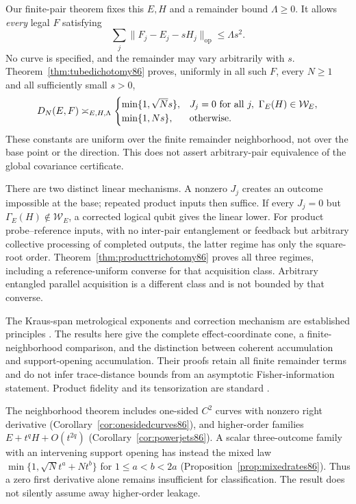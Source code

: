 Our finite-pair theorem fixes this $E,H$ and a remainder bound
$\Lambda\ge0$.  It allows \emph{every} legal $F$ satisfying
\[
 \sum_j\|F_j-E_j-sH_j\|_{\mathrm{op}}\le\Lambda s^2.
\]
No curve is specified, and the remainder may vary arbitrarily with
$s$.  Theorem~\ref{thm:tubedichotomy86} proves, uniformly in all such
$F$, every $N\ge1$ and all sufficiently small $s>0$,
\[
 D_N(E,F)\asymp_{E,H,\Lambda}
 \begin{cases}
 \min\{1,\sqrt N s\},&J_j=0\ \hbox{for all }j,
                         \ \Gamma_E(H)\in\mathcal W_E,\\
 \min\{1,Ns\},&\hbox{otherwise}.
 \end{cases}
\]
These constants are uniform over the finite remainder neighborhood,
not over the base point or the direction.  This does not assert
arbitrary-pair equivalence of the global covariance certificate.

There are two distinct linear mechanisms.  A nonzero $J_j$ creates an
outcome impossible at the base; repeated product inputs then suffice.
If every $J_j=0$ but $\Gamma_E(H)\notin\mathcal W_E$, a corrected
logical qubit gives the linear lower.  For product probe--reference
inputs, with no inter-pair entanglement or feedback but arbitrary
collective processing of completed outputs, the latter regime has
only the square-root order.  Theorem~\ref{thm:producttrichotomy86}
proves all three regimes, including a reference-uniform converse
for that acquisition class.  Arbitrary entangled parallel acquisition
is a different class and is not bounded by that converse.

The Kraus-span metrological exponents and correction mechanism are
established principles \cite{ZJ84,KL84}.  The results here give the
complete effect-coordinate cone, a finite-neighborhood comparison,
and the distinction between coherent accumulation and support-opening
accumulation.  Their proofs retain all finite remainder terms and do
not infer trace-distance bounds from an asymptotic Fisher-information
statement.  Product fidelity and its tensorization are standard
\cite[Chapter~3]{Watrous65}.

The neighborhood theorem includes one-sided $C^2$ curves with nonzero
right derivative (Corollary~\ref{cor:onesidedcurves86}), and higher-order
families $E+t^qH+O(t^{2q})$ (Corollary~\ref{cor:powerjets86}).
A scalar three-outcome family with an intervening support opening has
instead the mixed law $\min\{1,\sqrt N t^a+Nt^b\}$ for
$1\le a<b<2a$ (Proposition~\ref{prop:mixedrates86}).  Thus a zero
first derivative alone remains insufficient for classification.
The result does not silently assume away higher-order leakage.

